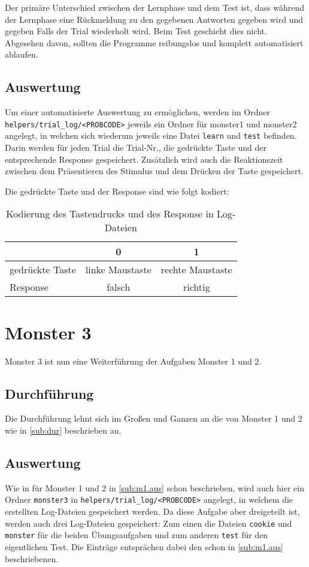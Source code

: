 \documentclass[a4paper]{scrartcl}
\newtheorem[M]{thmL}{Definition}
\begin{document}
Der primäre Unterschied zwischen der Lernphase und dem Test ist, dass während der Lernphase eine Rückmeldung zu den gegebenen Antworten gegeben wird und gegeben Falls der Trial wiederholt wird. Beim Test geschieht dies nicht. Abgesehen davon, sollten die Programme reibungslos und komplett automatisiert ablaufen.

\subsection{Auswertung}\label{sub:m1.aus}
Um einer automatisierte Auswertung zu ermöglichen, werden im Ordner \verb+helpers/trial_log/<PROBCODE>+ jeweils ein Ordner für monster1 und monster2 angelegt, in welchen sich wiederum jeweils eine Datei \verb+learn+ und \verb+test+ befinden. Darin werden für jeden Trial die Trial-Nr., die gedrückte Taste und der entsprechende Response gespeichert. Zusätzlich wird auch die Reaktionszeit zwischen dem Präsentieren des Stimulus und dem Drücken der Taste gespeichert.

Die gedrückte Taste und der Response sind wie folgt kodiert:\\
\begin{table}[h!]
	\begin{center}
		\begin{tabular}{|l|c|c|}
			\hline
			& 0 & 1 \\
			\hline \hline
			gedrückte Taste & linke Maustaste & rechte Maustaste\\
			\hline
			Response & falsch & richtig \\
			\hline
		\end{tabular}
		\caption{Kodierung des Tastendrucks und des Response in Log-Dateien}\label{tab:resp}
	\end{center}
\end{table}

\section{Monster 3}
Monster 3 ist nun eine Weiterführung der Aufgaben Monster 1 und 2.

\subsection{Durchführung}
Die Durchführung lehnt sich im Großen und Ganzen an die von Monster 1 und 2 wie in \autoref{sub:dur} beschrieben an.

\subsection{Auswertung}
Wie in für Monster 1 und 2 in \autoref{sub:m1.aus} schon beschrieben, wird auch hier ein Ordner \verb+monster3+ in \verb+helpers/trial_log/<PROBCODE>+ angelegt, in welchem die erstellten Log-Dateien gespeichert werden. Da diese Aufgabe aber dreigeteilt ist, werden auch drei Log-Dateien gespeichert: Zum einen die Dateien \verb+cookie+ und \verb+monster+ für die beiden Übungsaufgaben und zum anderen \verb+test+ für den eigentlichen Test. Die Einträge entsprächen dabei den schon in \autoref{sub:m1.aus} beschriebenen.
\end{document}
